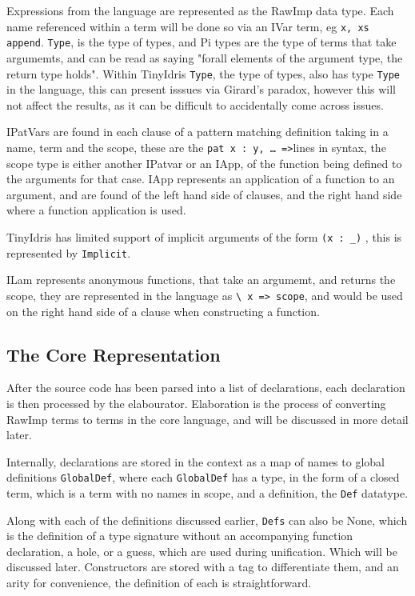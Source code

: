 \documentclass[a4paper]{article}
\begin{document}
Expressions from the language are represented as the RawImp data type.
Each name referenced within a term will be done so via an IVar term, eg
\texttt{x, xs append}. \texttt{Type}, is the type of types, and Pi types are the type
of terms that take argumemts, and can be read as saying "forall elements
of the argument type, the return type holds". Within TinyIdris \texttt{Type}, the type of types,
also has type \texttt{Type} in the language, this can present isssues via 
Girard's paradox, however this will not affect the results, as it can
be difficult to accidentally come across issues.  

IPatVars are found in each clause of a pattern matching definition 
taking in a name, term and the scope, these are the 
\texttt{pat x : y, \ldots{} =>}lines in syntax, the scope type is either another
IPatvar or an IApp, of the function being defined to the arguments for that case.
IApp represents an application of a function to an argument, and are 
found of the left hand side of clauses, and the right hand side where 
a function application is used.

TinyIdris has limited support of implicit arguments of the form
 \texttt{(x : \_)} , this is represented by \texttt{Implicit}.

ILam represents anonymous functions, that take an argumemt, and returns the
scope, they are represented in the language as \texttt{\textbackslash{} x => scope}, and would
be used on the right hand side of a clause when constructing a function.

\subsection{The Core Representation}
\label{sec:orgc03189c}

After the source code has been parsed into a list of declarations, each 
declaration is then processed by the elabourator. Elaboration is 
the process of converting RawImp terms to terms in the core language,
and will be discussed in more detail later. 

Internally, declarations are stored in the context as a map of names 
to global definitions \texttt{GlobalDef}, where each \texttt{GlobalDef} has a type, in the 
form of a closed term, which is a term with no names in scope, and a 
definition, the \texttt{Def} datatype.

Along with each of the definitions discussed earlier, \texttt{Defs} can also be
None, which is the definition of a type signature without an 
accompanying function declaration, a hole, or a guess, which are used 
during unification. Which will be discussed later. Constructors are
stored with a tag to differentiate them, and an arity for convenience,
the definition of each is straightforward.
\end{document}
